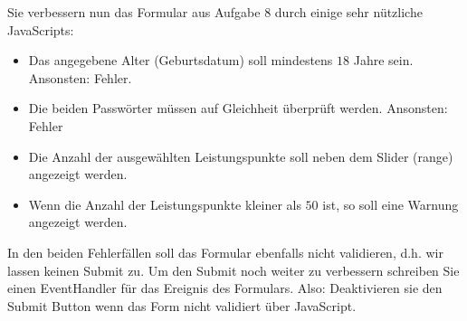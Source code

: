 %
\par Sie verbessern nun das Formular aus Aufgabe 8 durch einige sehr nützliche JavaScripts:
%
\begin{itemize}
\item Das angegebene Alter (Geburtsdatum) soll mindestens $18$ Jahre sein. Ansonsten: Fehler.
\item Die beiden Passwörter müssen auf Gleichheit überprüft werden. Ansonsten: Fehler
\item Die Anzahl der ausgewählten Leistungspunkte soll neben dem Slider (range) angezeigt werden.
\item Wenn die Anzahl der Leistungspunkte kleiner als $50$ ist, so soll eine Warnung angezeigt werden.
\end{itemize}
%
\par In den beiden Fehlerfällen soll das Formular ebenfalls nicht validieren, d.h. wir lassen keinen Submit zu. Um den Submit noch weiter zu verbessern schreiben Sie einen EventHandler für das  Ereignis des Formulars. Also: Deaktivieren sie den Submit Button wenn das Form nicht validiert über JavaScript.